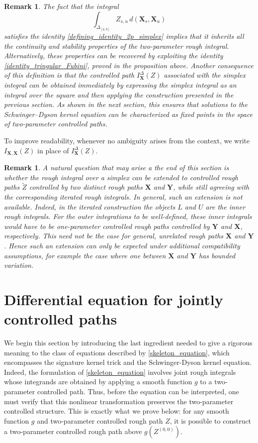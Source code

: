 \documentclass{article}%
\newtheorem{remark}[theorem]{Remark}
\begin{document}
\begin{remark}
The fact that the integral
\[
\int_{\Delta_{[a,b]}} Z_{s,u} \, d\left( \mathbf{X}_s, \mathbf{X}_u \right)
\]
satisfies the identity \eqref{defining_identity_2p_simplex} implies that it inherits all the continuity and stability properties of the two-parameter rough integral. Alternatively, these properties can be recovered by exploiting the identity \eqref{identity_tringular_Fubini}, proved in the proposition above. Another consequence of this definition is that the controlled path $I^\Delta_{\mathbf{X}}(Z)$ associated with the simplex integral can be obtained immediately by expressing the simplex integral as an integral over the square and then applying the construction presented in the previous section. As shown in the next section, this ensures that solutions to the Schwinger–Dyson kernel equation can be characterized as fixed points in the space of two-parameter controlled paths.
\end{remark}


To improve readability, whenever no ambiguity arises from the context, we write \(I_{\mathbf X, \mathbf X}(Z)\) in place of \(I_{\mathbf X}^{\Delta}(Z)\).

\begin{remark}
A natural
    question that may arise a the end of this section is whether the rough integral over a simplex can be extended to controlled
    rough paths $\tilde Z$ controlled by two distinct rough paths $\mathbf X$ and
    $\mathbf Y$, while still agreeing with the corresponding iterated rough integrals.
    In general, such an extension is not available. Indeed, in the iterated construction
    the objects $L$ and $U$ are the inner rough integrals. For the outer integrations
    to be well-defined, these inner integrals would have to be one-parameter controlled
    rough paths controlled by $\mathbf Y$ and $\mathbf X$, respectively. This need not
    be the case for general, unrelated rough paths $\mathbf X$ and $\mathbf Y$. Hence
    such an extension can only be expected under additional compatibility assumptions, for example the case where one between $\mathbf{X}$ and $\mathbf{Y}$ has bounded variation.
    \end{remark}
\section{Differential equation for jointly controlled paths} \label{composition and stability}
We begin this section by introducing the last ingredient needed to give a rigorous meaning to the class of equations described by \eqref{skeleton_equation}, which encompasses the signature kernel trick and the Schwinger-Dyson kernel equation. 
Indeed, the formulation of \eqref{skeleton_equation} involves joint rough integrals whose integrands are obtained by applying a smooth function $g$ to a two-parameter controlled path. 
Thus, before the equation can be interpreted, one must verify that this nonlinear transformation preserves the two-parameter controlled structure. 
This is exactly what we prove below: for any smooth function $g$ and two-parameter controlled rough path $Z$, it is possible to construct a two-parameter controlled rough path above $g(Z^{(0,0)})$.
\end{document}
